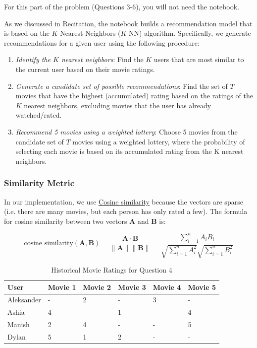 \documentclass{article}
\begin{document}
For this part of the problem (Questions 3-6), you will not need the notebook. 

As we discussed in Recitation, the notebook builds a recommendation model that is based on the $K$-Nearest Neighbors ($K$-NN) algorithm. Specifically, we generate recommendations for a given user using the following procedure:
\begin{enumerate}
    \item \textit{Identify the $K$ nearest neighbors}: Find the $K$ users that are most similar to the current user based on their movie ratings. 
    \item \textit{Generate a candidate set of possible recommendations}: Find the set of $T$ movies that have the highest (accumulated) rating based on the ratings of the $K$ nearest neighbors, excluding movies that the user has already watched/rated. 
    \item \textit{Recommend 5 movies using a weighted lottery}: Choose 5 movies from the candidate set of $T$ movies using a weighted lottery, where the probability of selecting each movie is based on its accumulated rating from the K nearest neighbors.
\end{enumerate}

\subsubsection*{Similarity Metric}

In our implementation, we use \href{https://en.wikipedia.org/wiki/Cosine_similarity}{Cosine similarity} because the vectors are sparse (i.e. there are many movies, but each person has only rated a few). The formula for cosine similarity between two vectors \( \mathbf{A} \) and \( \mathbf{B} \) is:

\[
\text{cosine\_similarity}(\mathbf{A}, \mathbf{B}) = \frac{\mathbf{A} \cdot \mathbf{B}}{\|\mathbf{A}\| \|\mathbf{B}\|}   = \frac{\sum_{i=1}^{n} A_i B_i}{\sqrt{\sum_{i=1}^{n} A_i^2} \sqrt{\sum_{i=1}^{n} B_i^2}}
\]



\begin{table}[h]
    \centering
    \caption{Historical Movie Ratings for Question 4}
    \begin{tabular}{llllll}
        \toprule
        \textbf{User} & \textbf{Movie 1} & \textbf{Movie 2} & \textbf{Movie 3} & \textbf{Movie 4} & \textbf{Movie 5} \\
        \midrule
        Aleksander & - & 2 & - & 3 & - \\
        Ashia & 4 & - & 1 & - & 4 \\
        Manish & 2 & 4 & - & - & 5 \\ 
        \midrule 
        Dylan & 5 & 1 & 2 & - & - \\
        \bottomrule
    \end{tabular}
    \label{tab:movie_ratings}
\end{table}
\end{document}
